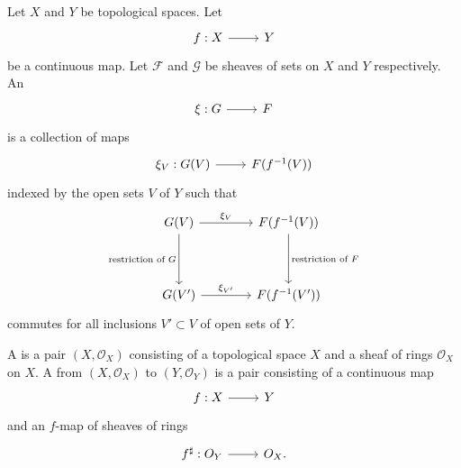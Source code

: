 \documentclass [11 pt, oneside] {article}
\begin{document}
\begin{definition}\label{}\text{}
Let $X$ and $Y$ be topological spaces.
Let
\[
\begin{tikzcd}
	f:X\ar[r]& Y
\end{tikzcd}
\]
be a continuous map.
Let $\mathscr{F}$ and $\mathscr{G}$ be sheaves of sets on $X$ and $Y$ respectively. 
An  
\[
\begin{tikzcd}
	\xi : \mathscr{G}\ar[r] & \mathscr{F}
\end{tikzcd}
\]
is a collection of maps
\[
\begin{tikzcd}
	\xi_{V} : \mathscr{G}(V)\ar[r]  &\mathscr{F}(f^{-1}(V))
\end{tikzcd}
\]
indexed by the open sets $V$ of $Y$ such that
\[
\begin{tikzcd}[sep = 4 em]
	\mathscr{G}(V)\ar[r,"\xi_{V}" ] \ar[d,"\textrm{restriction of $\mathscr{G}$}", swap] & \mathscr{F}(f^{-1}(V)) \ar[d,"\textrm{restriction of $\mathscr{F}$}"]\\
	\mathscr{G}(V')\ar[r,"\xi_{V'}" ] & \mathscr{F}(f^{-1}(V'))
\end{tikzcd}
\]
commutes for all inclusions $V'\subset V$ of open sets of $Y$.

\end{definition}


\begin{definition}\label{}\text{}
A  is a pair $(X,\mathscr{O}_{X})$ consisting of a topological space $X$ and a sheaf of rings $\mathscr{O}_{X}$ on $X$. A  from $(X,\mathscr{O}_{X})$ to $(Y,\mathscr{O}_{Y})$ is a pair consisting of a continuous map
\[
\begin{tikzcd}
	f:X\ar[r] &Y
\end{tikzcd}
\]
and an $f$-map of sheaves of rings
\[
\begin{tikzcd}
	f^{\sharp} : \mathscr{O}_{Y}\ar[r] & \mathscr{O}_{X}.
\end{tikzcd}
\]

\end{definition}

\end{document}
